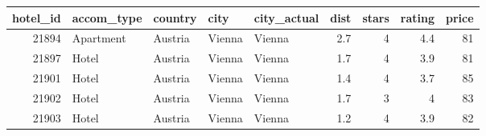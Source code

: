 
\begin{tabular}{rllllrrrr}
\toprule
\multicolumn{1}{l}{hotel\_id} & accom\_type & country & city  & city\_actual  & \multicolumn{1}{l}{dist} & \multicolumn{1}{l}{stars} & \multicolumn{1}{l}{rating} & \multicolumn{1}{l}{price} \\
\midrule
21894 & Apartment & Austria & Vienna & Vienna &  2.7   & 4     & 4.4   & 81 \\
21897 & Hotel & Austria & Vienna & Vienna &  1.7   & 4     & 3.9   & 81 \\
21901 & Hotel & Austria & Vienna & Vienna &  1.4   & 4     & 3.7   & 85 \\
21902 & Hotel & Austria & Vienna & Vienna &  1.7   & 3     & 4     & 83 \\
21903 & Hotel & Austria & Vienna & Vienna &  1.2   & 4     & 3.9   & 82 \\
\bottomrule
\end{tabular}%
